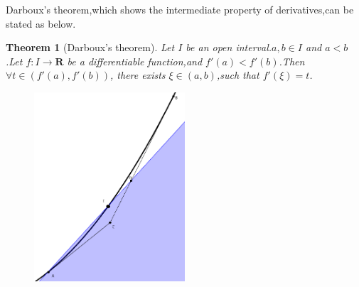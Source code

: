 \documentclass{amsart}
\theoremstyle{plain}
\newtheorem{theorem}{Theorem}
\theoremstyle{definition}
\begin{document}
Darboux's theorem,which shows the intermediate property of
derivatives,can be stated as below.
\begin{theorem}[Darboux's theorem]
Let $I$ be an open interval.$a,b\in I$ and $a<b$.Let $f:I\to \mathbf{R}$ be a
differentiable function,and $f'(a)<f'(b)$.Then $\forall t\in
(f'(a),f'(b))$, there exists $\xi\in
(a,b)$,such that $f'(\xi)=t$.
\end{theorem}
\begin{figure}[h]\centering
\includegraphics[width=0.5\textwidth]{A_geometric_proof_of_Darboux_theorem1.png}
  \caption{}
  \label{fig:1}
\end{figure}
\end{document}
